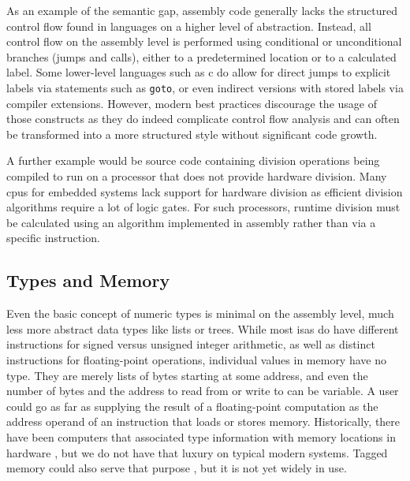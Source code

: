 As an example of the semantic gap, assembly code generally lacks the structured control flow found in languages on a higher level of abstraction.
Instead, all control flow on the assembly level is performed using conditional or unconditional branches (jumps and calls), either to a predetermined location or to a calculated label.
Some lower-level languages such as \gls{c} do allow for direct jumps to explicit labels via statements such as \lstinline|goto|, or even indirect versions with stored labels via compiler extensions.
However, modern best practices discourage the usage of those constructs as they do indeed complicate control flow analysis and can often be transformed into a more structured style without significant code growth.

A further example would be source code containing division operations being compiled to run on a processor that does not provide hardware division.
Many \acp{cpu} for embedded systems lack support for hardware division as efficient division algorithms require a lot of logic gates.
For such processors, runtime division must be calculated using an algorithm implemented in assembly rather than via a specific instruction.

\subsection{Types and Memory}
Even the basic concept of numeric types is minimal on the assembly level, much less more abstract data types like lists or trees.
While most \acp{isa} do have different instructions for signed versus unsigned integer arithmetic, as well as distinct instructions for floating-point operations, individual values in memory have no type.
They are merely lists of bytes starting at some address, and even the number of bytes and the address to read from or write to can be variable.
A user could go as far as supplying the result of a floating-point computation as the address operand of an instruction that loads or stores memory.
Historically, there have been computers that associated type information with memory locations in hardware \autocite{feustel1972rice,feustel1973advantages,thornton2008rice}, but we do not have that luxury on typical modern systems.
Tagged memory could also serve that purpose \autocite{bradbury2014tagged,song2015towards,zeldovich2008tagged}, but it is not yet widely in use.


